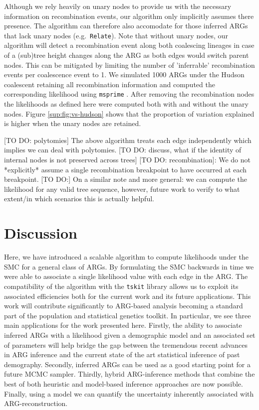 \documentclass{article}
\newcommand{\relate}[0]{\texttt{Relate}}
\begin{document}
Although we rely heavily on unary nodes to provide us with the necessary 
information on recombination events, our algorithm only implicitly assumes there presence.
The algorithm can therefore also accomodate for 
those inferred ARGs that lack unary nodes (e.g.\ \relate). 
Note that without unary nodes, our algorithm will detect a recombination event along 
both coalescing lineages in case of a (sub)tree height changes along the ARG as both 
edges would switch parent nodes. This can be mitigated by limiting the number of 
'inferrable' recombination events per coalescence event to 1.
We simulated 1000 ARGs under the Hudson coalescent retaining all recombination information 
and computed the corresponding likelihood using \texttt{msprime} \citep{baumdicker_efficient_2021}. 
After removing the recombination nodes the likelihoods as defined here were computed both with and 
without the unary nodes. Figure \ref{sup:fig:vs-hudson} shows that the proportion of variation 
explained is higher when the unary nodes are retained.

[TO DO: polytomies] The above algorithm treats each edge independently which implies 
we can deal with polytomies.
[TO DO: discuss, what if the identity of internal nodes is not preserved across trees]
[TO DO: recombination]: We do not *explicitly* assume a single recombination breakpoint to have 
occurred at each breakpoint.
[TO DO:] On a similar note and more general: we can compute the likelihood for any 
valid tree sequence, however, future work to verify to what extent/in which scenarios 
this is actually helpful.
 
\section{Discussion}

Here, we have introduced a scalable algorithm to compute likelihoods 
under the SMC for a general class of ARGs. By formulating the SMC backwards in time 
we were able to associate a single likelihood value with each edge in the ARG. 
The compatibility of the algorithm with the \texttt{tskit} library allows us to 
exploit its associated efficiencies both for the current work and its future 
applications. This work will contribute significantly 
to ARG-based analysis becoming a standard part of the population 
and statistical genetics toolkit. 
In particular, we see three main applications for the work presented here. 
Firstly, the ability to associate inferred ARGs with a likelihood given a demographic 
model and an associated set of parameters will help bridge the gap between the tremendous recent 
advances in ARG inference and the current state of the art statistical inference of 
past demography. 
Secondly, inferred ARGs can be used as a good starting point for a future MCMC sampler.
Thirdly, hybrid ARG-inference methods that combine the best of both 
heuristic and model-based inference approaches are now possible.
Finally, using a model we can quantify the uncertainty inherently associated 
with ARG-reconstruction.
\end{document}
